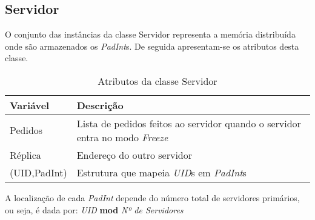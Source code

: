 \subsection{Servidor}
O conjunto das instâncias da classe Servidor representa a memória distribuída onde são armazenados os \textit{PadInt}s. De seguida apresentam-se os atributos desta classe.
\begin{table}[H]
\centering
\begin{tabular}{| p{2cm} | p{} |}
\hline
\textbf{Variável} & \textbf{Descrição} \\
\hline
Pedidos & Lista de pedidos feitos ao servidor quando o servidor entra no modo \textit{Freeze} \\
\hline
Réplica & Endereço do outro servidor \\
\hline
(UID,PadInt) & Estrutura que mapeia \textit{UID}s em \textit{PadInt}s \\
\hline
\end{tabular}
\caption{Atributos da classe Servidor}
\end{table}

A localização de cada \textit{PadInt} depende do número total de servidores primários, ou seja, é dada por: \textit{UID} \textbf{mod}  \textit{Nº de Servidores}